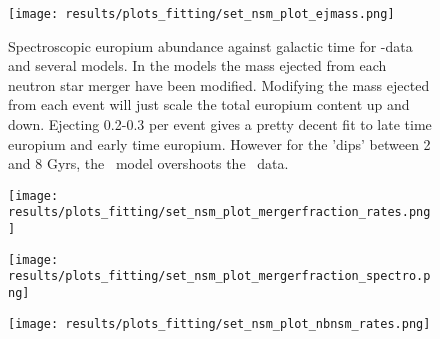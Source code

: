 \begin{figure}[h]
  \begin{minipage}[t][][t]{0.4\textwidth}
    \centering
    \texttt{[image: results/plots\_fitting/set\_nsm\_plot\_ejmass.png]}
    \caption[\todo NSM-ejectamass]{
      \label{fig:fit-v3-ejecta}
      Spectroscopic europium abundance against galactic time for \eris-data and several \omegamodel models. In the models the mass ejected from each neutron star merger have been modified.
      Modifying the mass ejected from each event will just scale the total europium content up and down.
      Ejecting 0.2-0.3 \msol per event gives a pretty decent fit to late time europium and early time europium.
      However for the 'dips' between 2 and 8 Gyrs, the \omegamodel\ model overshoots the \eris\ data.
    }
    \texttt{[image: results/plots\_fitting/set\_nsm\_plot\_mergerfraction\_rates.png]}
    \caption[\todo NSM fmerger rate]]{
      \label{fig:fit-v3-mergerfrac-nsmr}
    }
  \end{minipage}
  \hfill
  \begin{minipage}[t][][t]{0.4\textwidth}
    \centering
    \texttt{[image: results/plots\_fitting/set\_nsm\_plot\_mergerfraction\_spectro.png]}
    \caption[\todo mergerfraction spectroscopic plot]{
      \label{fig:fit-v3-mergerfrac-euro}
    }
    \texttt{[image: results/plots\_fitting/set\_nsm\_plot\_nbnsm\_rates.png]}
    \caption[\todo nbnsm rates plot]{
        \label{fig:fit-v3-number-nsmr}
      }
  \end{minipage}
\end{figure}
